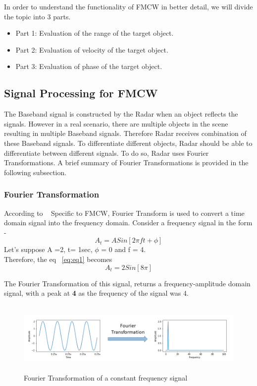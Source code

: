 In order to understand the functionality of FMCW in better detail, we will divide the topic into 3 parts.
\begin{itemize}
    \item Part 1: Evaluation of the range of the target object.
    \item Part 2: Evaluation of velocity of the target object.
    \item Part 3: Evaluation of phase of the target object.
\end{itemize}

\subsection{Signal Processing for FMCW}
The Baseband signal is constructed by the Radar when an object reflects the signals. However in a real scenario, there are multiple objects in the scene resulting in multiple Baseband signals. Therefore Radar receives combination of these Baseband signals. To differentiate different objects, Radar should be able to differentiate between different signals. To do so, Radar uses Fourier Transformations. A brief summary of Fourier Transformations is provided in the following subsection.


\subsubsection{Fourier Transformation} \label{sec:FT}
According to ~\cite{FT}
Specific to FMCW, Fourier Transform is used to convert a time domain signal into the frequency domain. 
Consider a frequency signal in the form -  
\begin{equation}\label{eq:eq1}
A_{t}= ASin[2\pi ft + \phi]
\end{equation}
Let's suppose A =2, t= 1sec, \(\phi\) = 0 and f = 4.
\\
Therefore, the eq ~\ref{eq:eq1} becomes
\begin{equation}
A_{t}= 2Sin[8\pi]    
\end{equation}

The Fourier Transformation of this signal, returns a frequency-amplitude domain signal, with a peak at \textbf{4} as the frequency of the signal was 4.

 \begin{figure}[ht]
  \begin{center}
    \includegraphics[width=1\textwidth, height = 3.5cm ]{Master's thesis/images/fft.png} 
    \caption{Fourier Transformation of a constant frequency signal}
    \label{fig:fft}
  \end{center}
\end{figure}  

